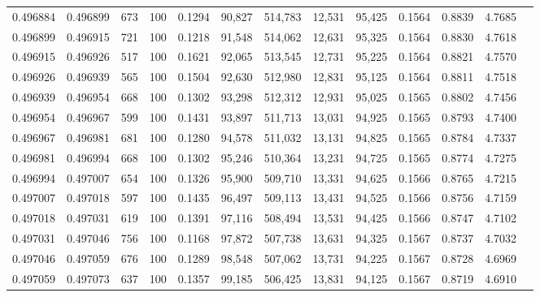 \begin{tabular}{rrrrrrrrrrrrr}
0.496884 & 0.496899 &   673 & 100 &                                     0.1294 &  90,827 & 514,783 &  12,531 &  95,425 & 0.1564 & 0.8839 & 4.7685 \\
0.496899 & 0.496915 &   721 & 100 &                                     0.1218 &  91,548 & 514,062 &  12,631 &  95,325 & 0.1564 & 0.8830 & 4.7618 \\
0.496915 & 0.496926 &   517 & 100 &                                     0.1621 &  92,065 & 513,545 &  12,731 &  95,225 & 0.1564 & 0.8821 & 4.7570 \\
0.496926 & 0.496939 &   565 & 100 &                                     0.1504 &  92,630 & 512,980 &  12,831 &  95,125 & 0.1564 & 0.8811 & 4.7518 \\
0.496939 & 0.496954 &   668 & 100 &                                     0.1302 &  93,298 & 512,312 &  12,931 &  95,025 & 0.1565 & 0.8802 & 4.7456 \\
0.496954 & 0.496967 &   599 & 100 &                                     0.1431 &  93,897 & 511,713 &  13,031 &  94,925 & 0.1565 & 0.8793 & 4.7400 \\
0.496967 & 0.496981 &   681 & 100 &                                     0.1280 &  94,578 & 511,032 &  13,131 &  94,825 & 0.1565 & 0.8784 & 4.7337 \\
0.496981 & 0.496994 &   668 & 100 &                                     0.1302 &  95,246 & 510,364 &  13,231 &  94,725 & 0.1565 & 0.8774 & 4.7275 \\
0.496994 & 0.497007 &   654 & 100 &                                     0.1326 &  95,900 & 509,710 &  13,331 &  94,625 & 0.1566 & 0.8765 & 4.7215 \\
0.497007 & 0.497018 &   597 & 100 &                                     0.1435 &  96,497 & 509,113 &  13,431 &  94,525 & 0.1566 & 0.8756 & 4.7159 \\
0.497018 & 0.497031 &   619 & 100 &                                     0.1391 &  97,116 & 508,494 &  13,531 &  94,425 & 0.1566 & 0.8747 & 4.7102 \\
0.497031 & 0.497046 &   756 & 100 &                                     0.1168 &  97,872 & 507,738 &  13,631 &  94,325 & 0.1567 & 0.8737 & 4.7032 \\
0.497046 & 0.497059 &   676 & 100 &                                     0.1289 &  98,548 & 507,062 &  13,731 &  94,225 & 0.1567 & 0.8728 & 4.6969 \\
0.497059 & 0.497073 &   637 & 100 &                                     0.1357 &  99,185 & 506,425 &  13,831 &  94,125 & 0.1567 & 0.8719 & 4.6910 \\

\end{tabular}
